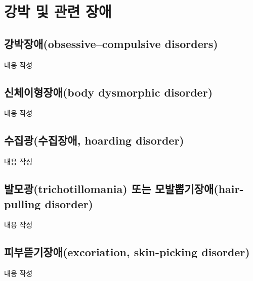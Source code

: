 \section{강박 및 관련 장애}

\subsection{강박장애(obsessive–compulsive disorders)}
내용 작성

\subsection{신체이형장애(body dysmorphic disorder)}
내용 작성

\subsection{수집광(수집장애, hoarding disorder)}
내용 작성

\subsection{발모광(trichotillomania) 또는 모발뽑기장애(hair-pulling disorder)}
내용 작성

\subsection{피부뜯기장애(excoriation, skin-picking disorder)}
내용 작성
